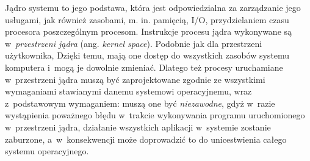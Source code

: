 \documentclass[12pt]{mwart}
\begin{document}
\par
%
\indent
	Jądro systemu to jego podstawa, która jest odpowiedzialna za zarządzanie jego usługami, jak również zasobami, m. in. pamięcią, I/O,
	przydzielaniem czasu procesora poszczególnym procesom. Instrukcje procesu jądra wykonywane są w~\emph{przestrzeni jądra}
  (ang. \emph{kernel space}). Podobnie jak dla przestrzeni użytkownika, Dzięki temu,
	mają one dostęp do wszystkich zasobów systemu komputera i~mogą je dowolnie zmieniać. Dlatego też procesy uruchamiane w~przestrzeni
	jądra muszą być zaprojektowane zgodnie ze wszystkimi wymaganiami stawianymi danemu systemowi operacyjnemu, wraz z~podstawowym wymaganiem:
	muszą one być \emph{niezawodne}, gdyż w~razie wystąpienia poważnego błędu w~trakcie wykonywania programu uruchomionego w~przestrzeni jądra,
	działanie wszystkich aplikacji w~systemie zostanie zaburzone, a~w~konsekwencji może doprowadzić to do unicestwienia całego systemu operacyjnego.
\par
%
\end{document}
